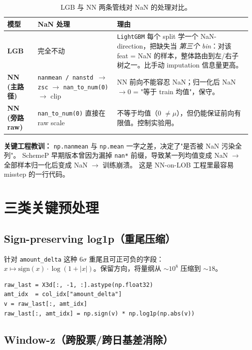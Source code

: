 \documentclass[10.5pt,a4paper]{article}
\begin{document}
\begin{table}[H]
\centering\small
\begin{tabular}{p{} p{} p{}}
\toprule
模型 & NaN 处理 & 理由 \\
\midrule
\textbf{LGB} & 完全不动 & \texttt{LightGBM} 每个 split 学一个 NaN-direction，把缺失当 \emph{第三个 bin}：对该 feat = NaN 的样本，整体路由到左/右子树之一。比手动 imputation 信息量更高。 \\
\textbf{NN (主路径)} & \texttt{nanmean / nanstd $\to$ zsc} $\to$ \texttt{nan\_to\_num(0)} $\to$ clip & NN 前向不能容忍 NaN；归一化后 NaN $\to 0$ = "等于 train 均值"，保守。 \\
\textbf{NN (旁路 raw)} & \texttt{nan\_to\_num(0)} 直接在 raw scale & 不等于均值（0 $\ne \mu$），但仍能保证前向有限值。控制实验用。 \\
\bottomrule
\end{tabular}
\caption{LGB 与 NN 两条管线对 NaN 的处理对比。}
\end{table}

\textbf{关键工程教训：} \texttt{np.nanmean} 与 \texttt{np.mean} 一字之差，决定了"是否被 NaN 污染全列"。
SchemeP 早期版本曾因为漏掉 \texttt{nan*} 前缀，导致某一列均值变成 NaN $\to$ 全部样本归一化后变成 NaN $\to$ 训练崩溃。
这是 NN-on-LOB 工程里最容易 misstep 的一行代码。

\section{三类关键预处理}

\subsection{Sign-preserving log1p（重尾压缩）}

针对 \texttt{amount\_delta} 这种 6$\sigma$ 重尾且可正可负的字段：$x \mapsto \mathrm{sign}(x)\cdot\log(1+|x|)$。保留方向，将量纲从 $\sim 10^8$ 压缩到 $\sim 18$。

\begin{lstlisting}
raw_last = X3d[:, -1, :].astype(np.float32)
amt_idx  = col_idx["amount_delta"]
v = raw_last[:, amt_idx]
raw_last[:, amt_idx] = np.sign(v) * np.log1p(np.abs(v))
\end{lstlisting}

\subsection{Window-z（跨股票/跨日基差消除）}
\end{document}

